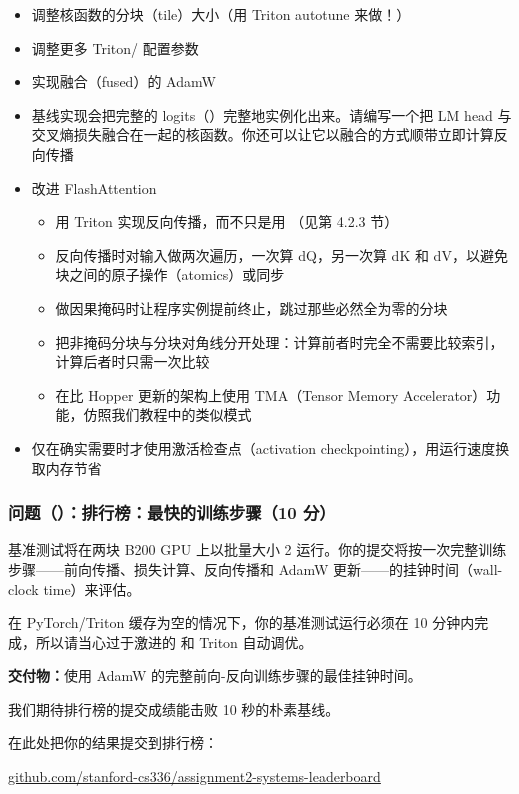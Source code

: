 \begin{itemize}
  \item 调整核函数的分块（tile）大小（用 Triton autotune 来做！）
  \item 调整更多 Triton/ 配置参数
  \item 实现融合（fused）的 AdamW
  \item 基线实现会把完整的 logits（）完整地实例化出来。请编写一个把 LM head 与交叉熵损失融合在一起的核函数。你还可以让它以融合的方式顺带立即计算反向传播
  \item 改进 FlashAttention
  \begin{itemize}
    \item 用 Triton 实现反向传播，而不只是用 （见第 4.2.3 节）
    \item 反向传播时对输入做两次遍历，一次算 dQ，另一次算 dK 和 dV，以避免块之间的原子操作（atomics）或同步
    \item 做因果掩码时让程序实例提前终止，跳过那些必然全为零的分块
    \item 把非掩码分块与分块对角线分开处理：计算前者时完全不需要比较索引，计算后者时只需一次比较
    \item 在比 Hopper 更新的架构上使用 TMA（Tensor Memory Accelerator）功能，仿照我们教程中的类似模式
  \end{itemize}
  \item 仅在确实需要时才使用激活检查点（activation checkpointing），用运行速度换取内存节省
\end{itemize}

\subsubsection*{问题（）：排行榜：最快的训练步骤（10 分）}

基准测试将在两块 B200 GPU 上以批量大小 2 运行。你的提交将按一次完整训练步骤——前向传播、损失计算、反向传播和 AdamW 更新——的挂钟时间（wall-clock time）来评估。

在 PyTorch/Triton 缓存为空的情况下，你的基准测试运行必须在 10 分钟内完成，所以请当心过于激进的  和 Triton 自动调优。

\textbf{交付物：}使用 AdamW 的完整前向-反向训练步骤的最佳挂钟时间。

我们期待排行榜的提交成绩能击败 10 秒的朴素基线。

在此处把你的结果提交到排行榜：

\begin{center}
\url{github.com/stanford-cs336/assignment2-systems-leaderboard}
\end{center}

